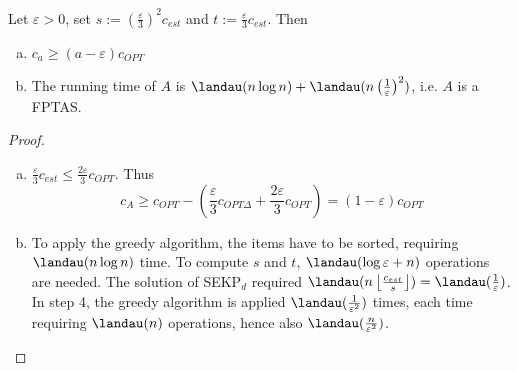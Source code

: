 \begin{thm} %
Let $\varepsilon > 0$, set $s := \left ( \frac{\varepsilon}{3} \right )^2
c_{est}$ and $t := \frac{\varepsilon}{3} c_{est}$. Then
\begin{enumerate}[(a)]
\item $c_a \geq (a - \varepsilon) c_{OPT}$
\item The running time of $A$ is $\landau(n \log n) + \landau(n \left (
\frac{1}{\varepsilon} \right )^2 )$, i.e. $A$ is a FPTAS.
\end{enumerate}
\end{thm}
\begin{proof}
\begin{enumerate}[(a)]
\item $\frac{\varepsilon}{3} c_{est} \leq \frac{2 \varepsilon}{3} c_{OPT}$.
Thus
\[
	c_A \geq c_{OPT} - \left ( \frac{\varepsilon}{3} c_{OPT \Delta} +
	\frac{2 \varepsilon}{3} c_{OPT} \right ) = (1 - \varepsilon) c_{OPT}
\]
\item To apply the greedy algorithm, the items have to be sorted, requiring
$\landau(n \log n)$ time. To compute $s$ and $t$, $\landau(\log \varepsilon
+ n)$ operations are needed. The solution of SEKP$_d$ required $\landau( n
\left \lfloor \frac{c_{est}}{s} \right \rfloor ) = \landau(
\frac{1}{\varepsilon})$. In step 4, the greedy algorithm is applied
$\landau(\frac{1}{\varepsilon^2})$ times, each time requiring $\landau(n)$
operations, hence also $\landau( \frac{n}{\varepsilon^2} )$.
\end{enumerate}
\end{proof}